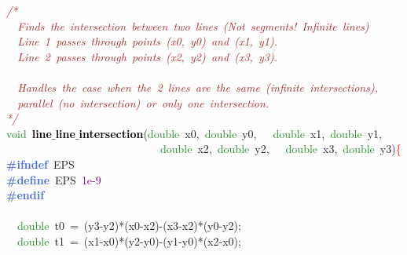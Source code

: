 {\ttfamily \raggedright {
\noindent
\mbox{}\textit{\textcolor{Brown}{/*}} \\
\mbox{}\textit{\textcolor{Brown}{\ \ Finds\ the\ intersection\ between\ two\ lines\ (Not\ segments!\ Infinite\ lines)}} \\
\mbox{}\textit{\textcolor{Brown}{\ \ Line\ 1\ passes\ through\ points\ (x0,\ y0)\ and\ (x1,\ y1).}} \\
\mbox{}\textit{\textcolor{Brown}{\ \ Line\ 2\ passes\ through\ points\ (x2,\ y2)\ and\ (x3,\ y3).}} \\
\mbox{} \\
\mbox{}\textit{\textcolor{Brown}{\ \ Handles\ the\ case\ when\ the\ 2\ lines\ are\ the\ same\ (infinite\ intersections),}} \\
\mbox{}\textit{\textcolor{Brown}{\ \ parallel\ (no\ intersection)\ or\ only\ one\ intersection.}} \\
\mbox{}\textit{\textcolor{Brown}{*/}} \\
\mbox{}\textcolor{ForestGreen}{void}\ \textbf{\textcolor{Black}{line$\_$line$\_$intersection}}\textcolor{BrickRed}{(}\textcolor{ForestGreen}{double}\ x0\textcolor{BrickRed}{,}\ \textcolor{ForestGreen}{double}\ y0\textcolor{BrickRed}{,}\ \ \ \textcolor{ForestGreen}{double}\ x1\textcolor{BrickRed}{,}\ \textcolor{ForestGreen}{double}\ y1\textcolor{BrickRed}{,} \\
\mbox{}\ \ \ \ \ \ \ \ \ \ \ \ \ \ \ \ \ \ \ \ \ \ \ \ \ \ \ \ \textcolor{ForestGreen}{double}\ x2\textcolor{BrickRed}{,}\ \textcolor{ForestGreen}{double}\ y2\textcolor{BrickRed}{,}\ \ \ \textcolor{ForestGreen}{double}\ x3\textcolor{BrickRed}{,}\ \textcolor{ForestGreen}{double}\ y3\textcolor{BrickRed}{)}\textcolor{Red}{\{} \\
\mbox{}\textbf{\textcolor{RoyalBlue}{\#ifndef}}\ EPS \\
\mbox{}\textbf{\textcolor{RoyalBlue}{\#define}}\ EPS\ \textcolor{Purple}{1e-9} \\
\mbox{}\textbf{\textcolor{RoyalBlue}{\#endif}} \\
\mbox{} \\
\mbox{}\ \ \textcolor{ForestGreen}{double}\ t0\ \textcolor{BrickRed}{=}\ \textcolor{BrickRed}{(}y3\textcolor{BrickRed}{-}y2\textcolor{BrickRed}{)*(}x0\textcolor{BrickRed}{-}x2\textcolor{BrickRed}{)-(}x3\textcolor{BrickRed}{-}x2\textcolor{BrickRed}{)*(}y0\textcolor{BrickRed}{-}y2\textcolor{BrickRed}{);} \\
\mbox{}\ \ \textcolor{ForestGreen}{double}\ t1\ \textcolor{BrickRed}{=}\ \textcolor{BrickRed}{(}x1\textcolor{BrickRed}{-}x0\textcolor{BrickRed}{)*(}y2\textcolor{BrickRed}{-}y0\textcolor{BrickRed}{)-(}y1\textcolor{BrickRed}{-}y0\textcolor{BrickRed}{)*(}x2\textcolor{BrickRed}{-}x0\textcolor{BrickRed}{);} \\
}}
